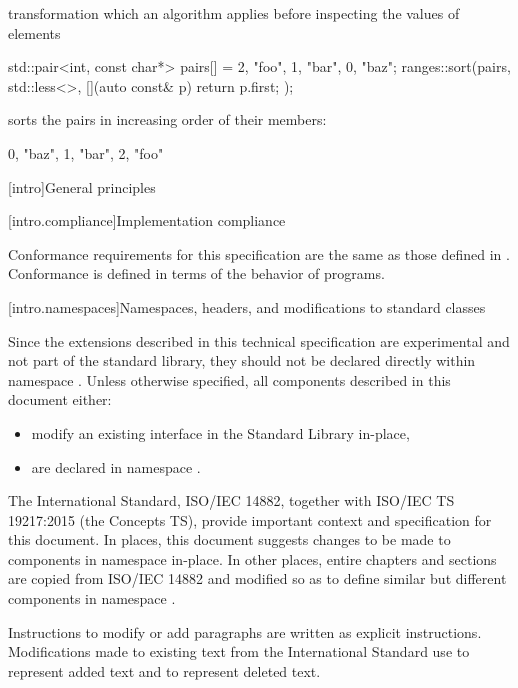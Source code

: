 %
 transformation which an algorithm applies
before inspecting the values of elements

\enterexample
\begin{codeblock}
std::pair<int, const char*> pairs[] = {{2, "foo"}, {1, "bar"}, {0, "baz"}};
ranges::sort(pairs, std::less<>{}, [](auto const& p) { return p.first; });
\end{codeblock}
sorts the pairs in increasing order of their  members:
\begin{codeblock}
{{0, "baz"}, {1, "bar"}, {2, "foo"}}
\end{codeblock}
\exitexample

[intro]{General principles}

[intro.compliance]{Implementation compliance}

\pnum
Conformance requirements for this specification are the same as those
defined in .
\enternote
Conformance is defined in terms of the behavior of programs.
\exitnote

[intro.namespaces]{Namespaces, headers, and modifications to standard classes}

\pnum
Since the extensions described in this technical specification are experimental and not
part of the \Cpp standard library, they should not be declared directly within namespace
. Unless otherwise specified, all components described in this document either:

\begin{itemize}
\item modify an existing interface in the \Cpp Standard Library in-place,
\item are declared in namespace .
\end{itemize}

\pnum
The International Standard, ISO/IEC 14882, together with ISO/IEC TS 19217:2015 (the Concepts TS),
provide important context and specification for this document. In places, this document suggests
changes to be made to components in namespace  in-place. In
other places, entire chapters and sections are copied from ISO/IEC 14882 and modified so as to
define similar but different components in namespace .

\pnum
Instructions to modify or add paragraphs are written as explicit instructions.
Modifications made to existing text from the International Standard use
 to represent added text and  to
represent deleted text.

